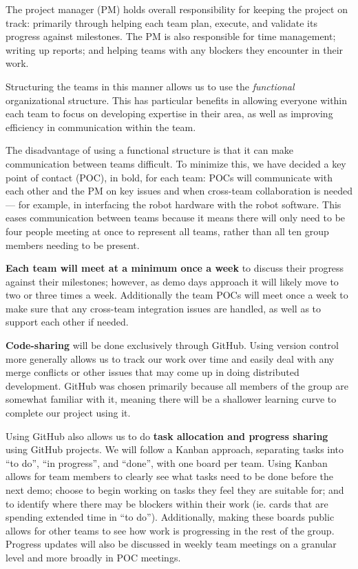 \documentclass{article}
\begin{document}
The project manager (PM) holds overall responsibility for keeping the project on track: primarily through helping each team plan, execute, and validate its progress against milestones. The PM is also responsible for time management; writing up reports; and helping teams with any blockers they encounter in their work.

Structuring the teams in this manner allows us to use the {\it functional} organizational structure. This has particular benefits in allowing everyone within each team to focus on developing expertise in their area, as well as improving efficiency in communication within the team.

The disadvantage of using a functional structure is that it can make communication between teams difficult. To minimize this, we have decided a key point of contact (POC), in bold, for each team: POCs will communicate with each other and the PM on key issues and when cross-team collaboration is needed --- for example, in interfacing the robot hardware with the robot software. This eases communication between teams because it means there will only need to be four people meeting at once to represent all teams, rather than all ten group members needing to be present.

{\bf Each team will meet at a minimum once a week} to discuss their progress against their milestones; however, as demo days approach it will likely move to two or three times a week. Additionally the team POCs will meet once a week to make sure that any cross-team integration issues are handled, as well as to support each other if needed. 

{\bf Code-sharing} will be done exclusively through GitHub. Using version control more generally allows us to track our work over time and easily deal with any merge conflicts or other issues that may come up in doing distributed development. GitHub was chosen primarily because all members of the group are somewhat familiar with it, meaning there will be a shallower learning curve to complete our project using it. 

Using GitHub also allows us to do {\bf task allocation and progress sharing} using GitHub projects. We will follow a Kanban approach, separating tasks into ``to do'', ``in progress'', and ``done'', with one board per team. Using Kanban allows for team members to clearly see what tasks need to be done before the next demo; choose to begin working on tasks they feel they are suitable for; and to identify where there may be blockers within their work (ie. cards that are spending extended time in ``to do''). Additionally, making these boards public allows for other teams to see how work is progressing in the rest of the group. Progress updates will also be discussed in weekly team meetings on a granular level and more broadly in POC meetings.
\end{document}
